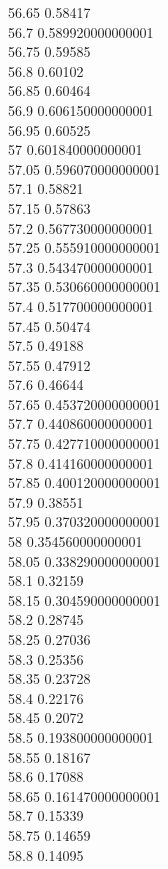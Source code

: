 {56.65	0.58417\\
56.7	0.589920000000001\\
56.75	0.59585\\
56.8	0.60102\\
56.85	0.60464\\
56.9	0.606150000000001\\
56.95	0.60525\\
57	0.601840000000001\\
57.05	0.596070000000001\\
57.1	0.58821\\
57.15	0.57863\\
57.2	0.567730000000001\\
57.25	0.555910000000001\\
57.3	0.543470000000001\\
57.35	0.530660000000001\\
57.4	0.517700000000001\\
57.45	0.50474\\
57.5	0.49188\\
57.55	0.47912\\
57.6	0.46644\\
57.65	0.453720000000001\\
57.7	0.440860000000001\\
57.75	0.427710000000001\\
57.8	0.414160000000001\\
57.85	0.400120000000001\\
57.9	0.38551\\
57.95	0.370320000000001\\
58	0.354560000000001\\
58.05	0.338290000000001\\
58.1	0.32159\\
58.15	0.304590000000001\\
58.2	0.28745\\
58.25	0.27036\\
58.3	0.25356\\
58.35	0.23728\\
58.4	0.22176\\
58.45	0.2072\\
58.5	0.193800000000001\\
58.55	0.18167\\
58.6	0.17088\\
58.65	0.161470000000001\\
58.7	0.15339\\
58.75	0.14659\\
58.8	0.14095\\
}

